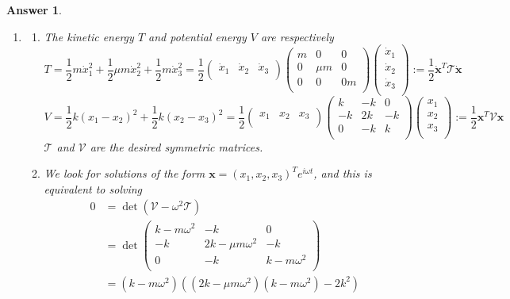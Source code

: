 \documentclass[a4paper]{article}
\newtheorem{ans}{Answer}[section]
\theoremstyle{new}
\begin{document}
\begin{ans}\leavevmode
\begin{enumerate}[label=(\alph*)]
\item
\begin{enumerate}[label=(\roman*)]
\item The kinetic energy $T$ and potential energy $V$ are respectively
$$T=\frac{1}{2}m\dot{x}_1^2+\frac{1}{2}\mu m\dot{x}_2^2+\frac{1}{2}m\dot{x}_3^2=\frac{1}{2}\begin{pmatrix}\dot{x}_1&\dot{x}_2&\dot{x}_3\\\end{pmatrix}\begin{pmatrix}m&0&0\\0&\mu m&0\\0&0&0m\\\end{pmatrix}\begin{pmatrix}\dot{x}_1\\\dot{x}_2\\\dot{x}_3\\\end{pmatrix}:=\frac{1}{2}\mathbf{\dot{x}}^T\mathcal{T}\mathbf{\dot{x}}$$
$$V=\frac{1}{2}k(x_1-x_2)^2+\frac{1}{2}k(x_2-x_3)^2=\frac{1}{2}\begin{pmatrix}x_1&x_2&x_3\\\end{pmatrix}\begin{pmatrix}k&-k&0\\-k&2k&-k\\0&-k&k\\\end{pmatrix}\begin{pmatrix}x_1\\x_2\\x_3\\\end{pmatrix}:=\frac{1}{2}\mathbf{x}^T\mathcal{V}\mathbf{x}$$
$\mathcal{T}$ and $\mathcal{V}$ are the desired symmetric matrices.
\item We look for solutions of the form $\mathbf{x}=(x_1,x_2,x_3)^Te^{i\omega t}$, and this is equivalent to solving
\begin{align}
0&=\det(\mathcal{V}-\omega^2\mathcal{T})\nonumber\\&=\det\begin{pmatrix}k-m\omega^2&-k&0\\-k&2k-\mu m\omega^2&-k\\0&-k&k-m\omega^2\\\end{pmatrix}\nonumber\\&=(k-m\omega^2)((2k-\mu m\omega^2)(k-m\omega^2)-2k^2)\nonumber

\end{align}
\end{enumerate}
\end{enumerate}
\end{ans}
\end{document}
